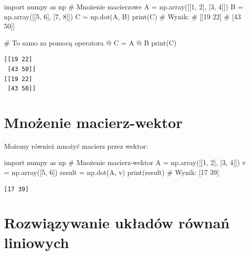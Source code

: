 \documentclass[
  polish,
  letterpaper,
  DIV=11,
  numbers=noendperiod]{scrreprt}
\newenvironment{Shaded}{\begin{snugshade}}{\end{snugshade}}
\newcommand{\BuiltInTok}[1]{\textcolor[rgb]{0.00,0.23,0.31}{#1}}
\newcommand{\CommentTok}[1]{\textcolor[rgb]{0.37,0.37,0.37}{#1}}
\newcommand{\DecValTok}[1]{\textcolor[rgb]{0.68,0.00,0.00}{#1}}
\newcommand{\ImportTok}[1]{\textcolor[rgb]{0.00,0.46,0.62}{#1}}
\newcommand{\NormalTok}[1]{\textcolor[rgb]{0.00,0.23,0.31}{#1}}
\newcommand{\OperatorTok}[1]{\textcolor[rgb]{0.37,0.37,0.37}{#1}}
\begin{document}
\begin{Shaded}
\begin{Highlighting}[]
\ImportTok{import}\NormalTok{ numpy }\ImportTok{as}\NormalTok{ np}
\CommentTok{\# Mnożenie macierzowe}
\NormalTok{A }\OperatorTok{=}\NormalTok{ np.array([[}\DecValTok{1}\NormalTok{, }\DecValTok{2}\NormalTok{], [}\DecValTok{3}\NormalTok{, }\DecValTok{4}\NormalTok{]])}
\NormalTok{B }\OperatorTok{=}\NormalTok{ np.array([[}\DecValTok{5}\NormalTok{, }\DecValTok{6}\NormalTok{], [}\DecValTok{7}\NormalTok{, }\DecValTok{8}\NormalTok{]])}
\NormalTok{C }\OperatorTok{=}\NormalTok{ np.dot(A, B)}
\BuiltInTok{print}\NormalTok{(C)}
\CommentTok{\# Wynik:}
\CommentTok{\# [[19 22]}
\CommentTok{\#  [43 50]]}

\CommentTok{\# To samo za pomocą operatora @}
\NormalTok{C }\OperatorTok{=}\NormalTok{ A }\OperatorTok{@}\NormalTok{ B}
\BuiltInTok{print}\NormalTok{(C)}
\end{Highlighting}
\end{Shaded}

\begin{verbatim}
[[19 22]
 [43 50]]
[[19 22]
 [43 50]]
\end{verbatim}

\section{Mnożenie macierz-wektor}\label{mnoux17cenie-macierz-wektor}

Możemy również mnożyć macierz przez wektor:

\begin{Shaded}
\begin{Highlighting}[]
\ImportTok{import}\NormalTok{ numpy }\ImportTok{as}\NormalTok{ np}
\CommentTok{\# Mnożenie macierz{-}wektor}
\NormalTok{A }\OperatorTok{=}\NormalTok{ np.array([[}\DecValTok{1}\NormalTok{, }\DecValTok{2}\NormalTok{], [}\DecValTok{3}\NormalTok{, }\DecValTok{4}\NormalTok{]])}
\NormalTok{v }\OperatorTok{=}\NormalTok{ np.array([}\DecValTok{5}\NormalTok{, }\DecValTok{6}\NormalTok{])}
\NormalTok{result }\OperatorTok{=}\NormalTok{ np.dot(A, v)}
\BuiltInTok{print}\NormalTok{(result)  }\CommentTok{\# Wynik: [17 39]}
\end{Highlighting}
\end{Shaded}

\begin{verbatim}
[17 39]
\end{verbatim}

\section{Rozwiązywanie układów równań
liniowych}\label{rozwiux105zywanie-ukux142aduxf3w-ruxf3wnaux144-liniowych}
\end{document}
